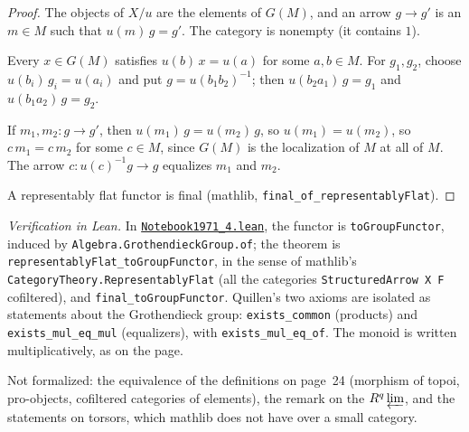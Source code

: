 \begin{proof}
The objects of $X/u$ are the elements of $G(M)$, and an arrow $g \to g'$ is an $m \in M$ such that $u(m)\,g = g'$. The category is nonempty (it contains $1$).

Every $x \in G(M)$ satisfies $u(b)\,x = u(a)$ for some $a, b \in M$. For $g_1, g_2$, choose $u(b_i)\,g_i = u(a_i)$ and put $g = u(b_1 b_2)^{-1}$; then $u(b_2 a_1)\,g = g_1$ and $u(b_1 a_2)\,g = g_2$.

If $m_1, m_2 : g \to g'$, then $u(m_1)\,g = u(m_2)\,g$, so $u(m_1) = u(m_2)$, so $c\,m_1 = c\,m_2$ for some $c \in M$, since $G(M)$ is the localization of $M$ at all of $M$. The arrow $c : u(c)^{-1} g \to g$ equalizes $m_1$ and $m_2$.

A representably flat functor is final (mathlib, \texttt{final\_of\_representablyFlat}).
\end{proof}

\begin{sloppypar}
\noindent\emph{Verification in Lean.} In \href{\leanblobmain/Notebook1971_4.lean}{\texttt{Notebook1971\_4.\allowbreak{}lean}}, the functor is \texttt{toGroupFunctor}, induced by \texttt{Algebra.GrothendieckGroup.of}; the theorem is \texttt{representablyFlat\_toGroupFunctor}, in the sense of mathlib's \texttt{CategoryTheory.RepresentablyFlat} (all the categories \texttt{StructuredArrow X F} cofiltered), and \texttt{final\_toGroupFunctor}. Quillen's two axioms are isolated as statements about the Grothendieck group: \texttt{exists\_common} (products) and \texttt{exists\_mul\_eq\_mul} (equalizers), with \texttt{exists\_mul\_eq\_of}. The monoid is written multiplicatively, as on the page.
\end{sloppypar}

Not formalized: the equivalence of the definitions on page~24 (morphism of topoi, pro-objects, cofiltered categories of elements), the remark on the $R^q\varprojlim$, and the statements on torsors, which mathlib does not have over a small category.

